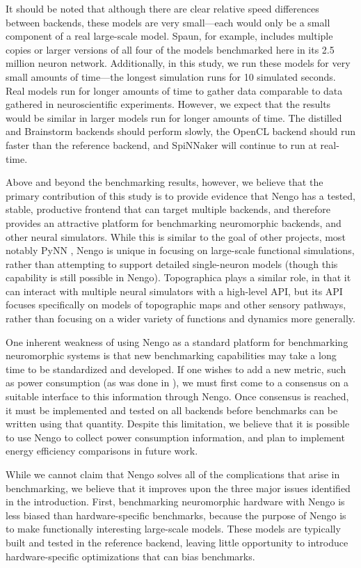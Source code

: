 \documentclass{frontiersSCNS}
\begin{document}
It should be noted that although there are clear
relative speed differences between backends,
these models are very small---each would only
be a small component of a real large-scale model.
Spaun, for example, includes multiple copies
or larger versions of all four of the models
benchmarked here in its 2.5 million neuron network.
Additionally, in this study, we run these models
for very small amounts of time---the longest
simulation runs for 10 simulated seconds.
Real models run for longer amounts of time
to gather data comparable to data gathered
in neuroscientific experiments.
However, we expect that the results
would be similar
in larger models run for longer amounts of time.
The distilled and Brainstorm backends should
perform slowly, the OpenCL backend should
run faster than the reference backend,
and SpiNNaker will continue to run at real-time.

Above and beyond the benchmarking results,
however, we believe that the primary contribution
of this study is to provide evidence that Nengo
has a tested, stable, productive frontend
that can target multiple backends,
and therefore provides an attractive platform
for benchmarking neuromorphic backends,
and other neural simulators.
While this is similar to the goal
of other projects, most notably PyNN \citep{davison2008},
Nengo is unique in focusing on
large-scale functional simulations,
rather than attempting to support
detailed single-neuron models
(though this capability is still possible in Nengo).
Topographica \citep{bednar2009} plays a similar role,
in that it can interact with multiple neural simulators
with a high-level API, but its API focuses specifically
on models of topographic maps
and other sensory pathways,
rather than focusing on
a wider variety of functions
and dynamics more generally.

One inherent weakness of using Nengo
as a standard platform for benchmarking
neuromorphic systems is that new benchmarking
capabilities may take a long time to
be standardized and developed.
If one wishes to add a new metric,
such as power consumption
(as was done in \citealp{stromatias2013}),
we must first come to a consensus
on a suitable interface to this information
through Nengo.
Once consensus is reached,
it must be implemented and tested
on all backends before
benchmarks can be written using
that quantity.
Despite this limitation,
we believe that it is possible to use
Nengo to collect power consumption information,
and plan to implement energy efficiency comparisons
in future work.

While we cannot claim that Nengo
solves all of the complications that arise
in benchmarking,
we believe that it improves upon
the three major issues identified in the introduction.
First, benchmarking neuromorphic hardware
with Nengo is less biased than
hardware-specific benchmarks,
because the purpose of Nengo is
to make functionally interesting large-scale models.
These models are typically built and tested
in the reference backend,
leaving little opportunity to introduce
hardware-specific optimizations
that can bias benchmarks.
\end{document}
